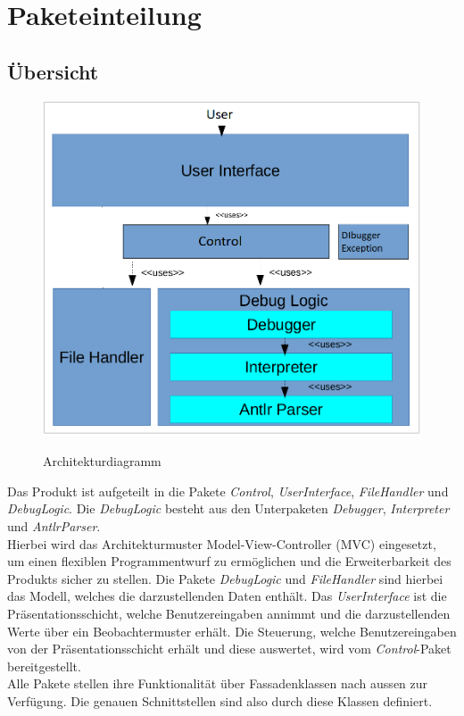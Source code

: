 \documentclass[parskip=full]{scrartcl}
\begin{document}
\newpage


\section{Paketeinteilung} %

\subsection{Übersicht}

\begin{figure}[!h]
\centering
\includegraphics[scale=0.35]{../Plichtenheft/Architektur.png} \\
\caption{Architekturdiagramm}
\end{figure}
Das Produkt ist aufgeteilt in die Pakete \textit{Control}, \textit{UserInterface}, \textit{FileHandler} und \textit{DebugLogic}.
Die \textit{DebugLogic} besteht aus den Unterpaketen \textit{Debugger}, \textit{Interpreter} und
\textit{AntlrParser}.\\
Hierbei wird das Architekturmuster Model-View-Controller (MVC) eingesetzt, um einen flexiblen Programmentwurf zu ermöglichen und die Erweiterbarkeit des Produkts sicher zu stellen. Die Pakete \textit{DebugLogic} und \textit{FileHandler} sind hierbei das Modell, welches die darzustellenden Daten enthält. Das \textit{UserInterface} ist die Präsentationsschicht, welche Benutzereingaben annimmt und die darzustellenden Werte über ein Beobachtermuster erhält. Die Steuerung, welche Benutzereingaben von der Präsentationsschicht erhält und diese auswertet, wird vom \textit{Control}-Paket bereitgestellt. \\
Alle Pakete stellen ihre Funktionalität über Fassadenklassen nach aussen zur Verfügung. Die genauen Schnittstellen sind also durch diese Klassen definiert.
\end{document}
